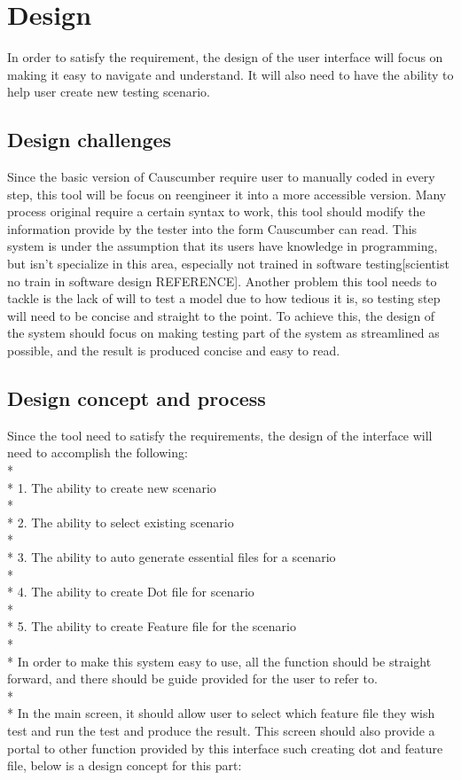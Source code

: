 \chapter{Design}
In order to satisfy the requirement, the design of the user interface will focus on making it easy to navigate and understand. It will also need to have the ability to help user create new testing scenario.
\section{Design challenges}
Since the basic version of Causcumber require user to manually coded in every step, this tool will be focus on reengineer it into a more accessible version. Many process original require a certain syntax to work, this tool should modify the information provide by the tester into the form Causcumber can read. This system is under the assumption that its users have knowledge in programming, but isn’t specialize in this area, especially not trained in software testing[scientist no train in software design REFERENCE]. Another problem this tool needs to tackle is the lack of will to test a model due to how tedious it is, so testing step will need to be concise and straight to the point. To achieve this, the design of the system should focus on making testing part of the system as streamlined as possible, and the result is produced concise and easy to read.

\section{Design concept and process}
Since the tool need to satisfy the requirements, the design of the interface will need to accomplish the following:\\*
\\*
1.	The ability to create new scenario\\*
\\*
2.	The ability to select existing scenario\\*
\\*
3.	The ability to auto generate essential files for a scenario\\*
\\*
4.	The ability to create Dot file for scenario\\*
\\*
5.	The ability to create Feature file for the scenario\\*
\\*
In order to make this system easy to use, all the function should be straight forward, and there should be guide provided for the user to refer to. \\*\\*
In the main screen, it should allow user to select which feature file they wish test and run the test and produce the result. This screen should also provide a portal to other function provided by this interface such creating dot and feature file, below is a design concept for this part:

